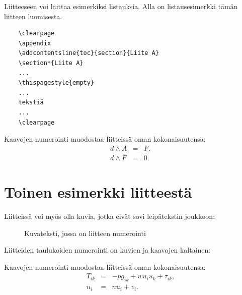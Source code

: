 \documentclass[finnish, 12pt, a4paper, sci, utf8, pdfa]{aaltothesis}
\begin{document}
Liitteeseen voi laittaa esimerkiksi listauksia. Alla on 
listausesimerkki tämän liitteen luomisesta. 

\begin{verbatim}
	\clearpage
	\appendix
	\addcontentsline{toc}{section}{Liite A}
	\section*{Liite A}
	...
	\thispagestyle{empty}
	...
	tekstiä
	...
	\clearpage
\end{verbatim}

Kaavojen numerointi muodostaa liitteissä oman kokonaisuutensa:
\begin{eqnarray}
d \wedge A  &=& F, \label{liitekaava1}\\
d \wedge F  &=& 0. \label{liitekaava2}
\end{eqnarray}


\clearpage
\section{Toinen esimerkki liitteestä\label{LiiteB}}


Liitteissä voi myös olla kuvia, jotka
eivät sovi leipätekstin joukkoon:
\begin{figure}[htb]
\begin{center}
\end{center}
\caption{Kuvateksti, jossa on liitteen numerointi}
\label{liitekuva}
\end{figure}
Liitteiden taulukoiden numerointi on kuvien ja kaavojen kaltainen:
\begin{table}[htb]
\caption{Taulukon kuvateksti.}
\label{liitetaulukko}
\begin{center}
\end{center}
\end{table}
Kaavojen numerointi muodostaa liitteissä oman kokonaisuutensa:
\begin{eqnarray}
T_{ik} &=& -p g_{ik} + w u_i u_k + \tau_{ik},  \label{liitekaava3} \\
n_i    &=& n u_i + v_i.                      \label{liitekaava4}
\end{eqnarray}
\end{document}
